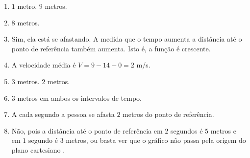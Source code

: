 \documentclass[10 pt,usenames,dvipsnames, oneside]{article}
\begin{document}
\ifdefined\prof
\begin{solucao}
\begin{enumerate}
\item $1$ metro. $9$ metros.
\item $8$ metros.
\item Sim, ela está se afastando. A medida que o tempo aumenta a distância até o ponto de referência também aumenta. Isto é, a função é crescente.
\item A velocidade média é $V=9−14−0=2$ m/s.
\item $3$ metros. $2$ metros.
\item $3$ metros em ambos os intervalos de tempo.
\item A cada segundo a pessoa se afasta $2$ metros do ponto de referência.
\item Não, pois a distância até o ponto de referência em $2$ segundos é $5$ metros e em $1$ segundo é $3$ metros, ou basta ver que o gráfico não passa pela origem do plano cartesiano .
\end{enumerate}
\end{solucao}
\fi
\end{document}
